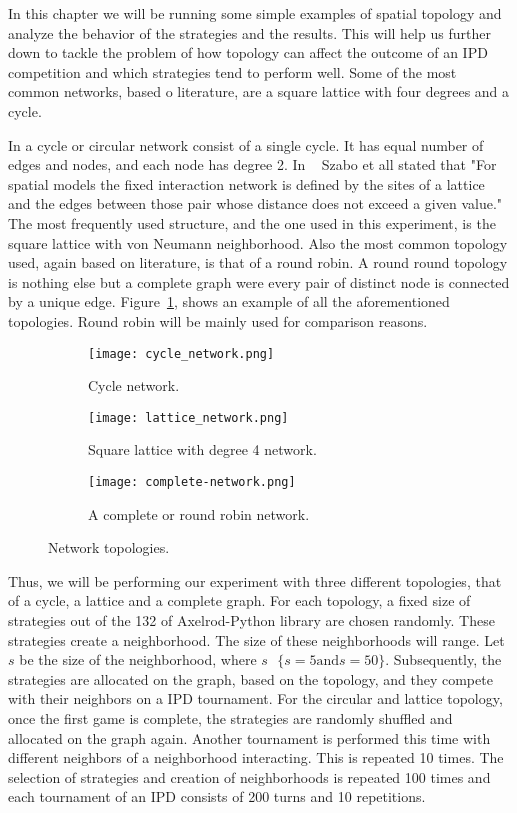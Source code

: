 In this chapter we will be running some simple examples of spatial topology and
analyze the behavior of the strategies and the results. This will help us further
down to tackle the problem of how topology can affect the outcome of an IPD
competition and which strategies tend to perform well. Some of the most common
networks, based o literature, are a square lattice with four degrees
and a cycle.

In a cycle or circular network consist of a single cycle. It has
equal number of edges and nodes, and each node has degree 2. In ~\cite{Szabo2007}
Szabo et all stated that "For spatial models the fixed interaction network is
defined by the sites of a lattice and the edges between those pair whose distance
does not exceed a given value."  The most frequently used structure, and the one
used in this experiment, is the square lattice with von Neumann neighborhood.
Also the most common topology used, again based on literature, is that of a
round robin. A round round topology is nothing else but a complete
graph were every pair of distinct node is connected by a unique edge.
Figure~\ref{fig:networks}, shows an example of all the aforementioned topologies.
Round robin will be mainly used for comparison reasons.

\begin{figure}[h]
\centering
    \begin{subfigure}[t]{0.45\textwidth}
    \centering
        \texttt{[image: cycle\_network.png]}
    \caption{Cycle network.}
    \end{subfigure}
\hfill
    \begin{subfigure}[t]{0.52\textwidth}\centering
    \centering
        \texttt{[image: lattice\_network.png]}
    \caption{Square lattice with degree 4 network.}
    \end{subfigure}
\hfill
    \begin{subfigure}[t]{0.52\textwidth}\centering
    \centering
        \texttt{[image: complete-network.png]}
    \caption{A complete or round robin network.}
    \end{subfigure}
\caption{Network topologies.}
\label{fig:networks}
\end{figure}

Thus, we will be performing our experiment with three different topologies, that
of a cycle, a lattice and a complete graph.
For each topology, a fixed size of strategies out of the 132 of Axelrod-Python
library are chosen randomly. These strategies create a neighborhood.
The size of these neighborhoods will range. Let \( s\) be the size of
the neighborhood, where \(s \textrm{ }\{ s=5 \textrm{and} s=50 \}\).
Subsequently, the strategies are allocated on the graph, based
on the topology, and they compete with their neighbors on a IPD tournament.
For the circular and lattice topology, once the first game is complete,
the strategies are randomly shuffled and allocated on the graph again.
Another tournament is performed this time with different neighbors of a
neighborhood interacting. This is repeated 10 times.
The selection of strategies and creation of neighborhoods is repeated 100 times
and each tournament of an IPD consists of 200 turns and 10 repetitions.

